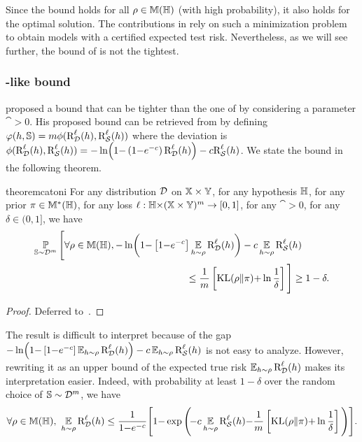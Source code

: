 Since the bound holds for all $\rho\in\mathbb{M}(\mathbb{H})$ (with high probability), it also holds for the optimal solution.
The contributions in  rely on such a minimization problem to obtain models with a certified expected test risk.
Nevertheless, as we will see further, the bound of  is not the tightest.

\subsubsection{\citeauthor{Catoni2007}-like bound}
\label{chap:pac-bayes:subsubsection:catoni-germain}

\citet[Theorem 1.2.1]{Catoni2007} proposed a bound that can be tighter than the one of  by considering a parameter $\cat>0$.
His proposed bound can be retrieved from  by defining $\varphi(h,\mathbb{S}) = m\phi(\text{R}^{\ell}_{\mathcal{D}}(h), \text{R}^{\ell}_{\mathcal{S}}(h))$ where the deviation is $\phi(\text{R}^{\ell}_{\mathcal{D}}(h), \text{R}^{\ell}_{\mathcal{S}}(h))=-\ln\!\left( 1{-}\left(1{-}e^{-c}\right)\text{R}^{\ell}_{\mathcal{D}}(h)\right)-c\text{R}^{\ell}_{\mathcal{S}}(h)$. 
We state the bound in the following theorem.

\begin{restatable}{theorem}{catoni}\label{chap:pac-bayes:theorem:catoni}
For any distribution $\mathcal{D}$ on $\mathbb{X}\times\mathbb{Y}$, for any hypothesis $\mathbb{H}$, for any prior $\pi\in\mathbb{M}^{*}(\mathbb{H})$, for any loss $\ell: \mathbb{H}{\times}(\mathbb{X}\times\mathbb{Y})^m \to [0, 1]$, for any $\cat>0$, for any $\delta\in(0, 1]$, we have
\begin{align}
    \PP_{\S\sim\D^\m}\Bigg[ \forall\Q\in\M(\H), 
    -\ln\!\LP 1{-}\LB1{-}e^{{-}\cat}\RB\EE_{\h\sim\Q}\RiskLoss_{\D}(\h)\RP&-\cat\EE_{\h\sim\Q}\RiskLoss_{\dS}(\h)\nonumber\\
    &\hspace{-2cm}\le \frac{1}{\m}\LB\KL(\Q\|\P){+}\ln\frac{1}{\delta}\RB\Bigg] \ge 1-\delta.\label{chap:pac-bayes:eq:catoni}
\end{align}
\end{restatable}
\begin{noaddcontents}\begin{proof}
Deferred to~.
\end{proof}\end{noaddcontents}

The result is difficult to interpret because of the gap $-\ln\!\left( 1{-}\left[1{-}e^{{-}c}\right]\operatorname*{\mathbb{E}}_{h\sim\rho}\text{R}^{\ell}_{\mathcal{D}}(h)\right)-c\operatorname*{\mathbb{E}}_{h\sim\rho}\text{R}^{\ell}_{\mathcal{S}}(h)$ is not easy to analyze.
However, rewriting it as an upper bound of the expected true risk $\operatorname*{\mathbb{E}}_{h\sim\rho}\text{R}^{\ell}_{\mathcal{D}}(h)$ makes its interpretation easier.
Indeed, with probability at least $1-\delta$ over the random choice of $\mathbb{S}\sim\mathcal{D}^m$, we have
\begin{align*}
\forall\rho\in\mathbb{M}(\mathbb{H}),\ \operatorname*{\mathbb{E}}_{h\sim\rho}\text{R}^{\ell}_{\mathcal{D}}(h) \le \frac{1}{1{-}e^{{-}c}}\Bigg[1{-}\exp\Bigg(\!{-}c\operatorname*{\mathbb{E}}_{h\sim\rho}\text{R}^{\ell}_{\mathcal{S}}(h){-}\frac{1}{m}\left[\operatorname{KL}(\rho\|\pi){+}\ln\frac{1}{\delta}\right]\Bigg)\Bigg].
\end{align*}

